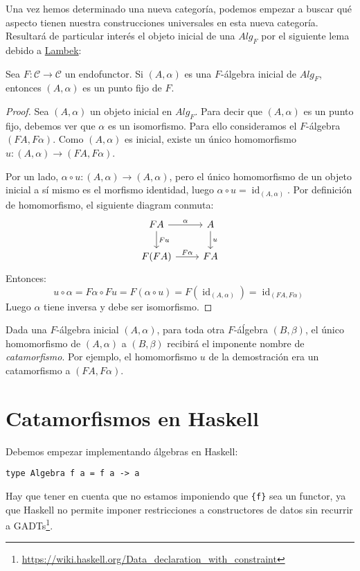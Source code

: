 \documentclass[12pt, twoside]{book}
\newcommand{\newterm}[1]{\index{#1}\emph{#1}}
\newcommand{\code}[1]{\Verb+{#1}+}
\newcommand{\cat}{{\mathcal{C}}}
\DeclareMathOperator{\id}{id}
\begin{document}
Una vez hemos determinado una nueva categoría, podemos empezar a buscar qué aspecto tienen nuestra construcciones universales en esta nueva categoría.
Resultará de particular interés el objeto inicial de una $Alg_F$ por el siguiente lema debido a \hyperref[lambek-pf]{Lambek}:

\begin{lemma}\label{lambek-lemma}
Sea $F \colon \cat \to \cat$ un endofunctor.
Si $(A,\alpha)$ es una $F$-álgebra inicial de $Alg_F$, entonces $(A,\alpha)$ es un punto fijo de $F$.
\end{lemma}
\begin{proof}
Sea $(A,\alpha)$ un objeto inicial en $Alg_F$.
Para decir que $(A,\alpha)$ es un punto fijo, debemos ver que $\alpha$ es un isomorfismo.
Para ello consideramos el $F$-álgebra $(F A, F \alpha)$.
Como $(A,\alpha)$ es inicial, existe un único homomorfismo $u \colon (A, \alpha) \to (F A, F \alpha)$.

Por un lado, $\alpha \circ u \colon (A, \alpha) \to (A, \alpha)$, pero el único homomorfismo de un objeto inicial a sí mismo es el morfismo identidad, luego $\alpha \circ u = \id_{(A, \alpha)}$.
Por definición de homomorfismo, el siguiente diagram conmuta:
\[
\begin{tikzcd}
F A \arrow[r,"\alpha"] \arrow[d,"F u"] & A \arrow[d,"u"]\\
F (F A) \arrow[r,"F \alpha"] & F A
\end{tikzcd}
\]
Entonces:
\[ u \circ \alpha = F \alpha \circ F u = F (\alpha \circ u) = F (\id_{(A, \alpha)}) = \id_{(F A, F \alpha)} \]
Luego $\alpha$ tiene inversa y debe ser isomorfismo.
\end{proof}

Dada una $F$-álgebra inicial $(A,\alpha)$, para toda otra $F$-áĺgebra $(B,\beta)$, el único homomorfismo de $(A,\alpha)$ a $(B,\beta)$ recibirá el imponente nombre de \newterm{catamorfismo}.
Por ejemplo, el homomorfismo $u$ de la demostración era un catamorfismo a $(F A, F \alpha)$.

\section{Catamorfismos en Haskell}

Debemos empezar implementando álgebras en Haskell:
\begin{verbatim}
type Algebra f a = f a -> a
\end{verbatim}
Hay que tener en cuenta que no estamos imponiendo que \code{f} sea un functor, ya que Haskell no permite imponer restricciones a constructores de datos sin recurrir a GADTs\footnote{\url{https://wiki.haskell.org/Data_declaration_with_constraint}}.
\end{document}
